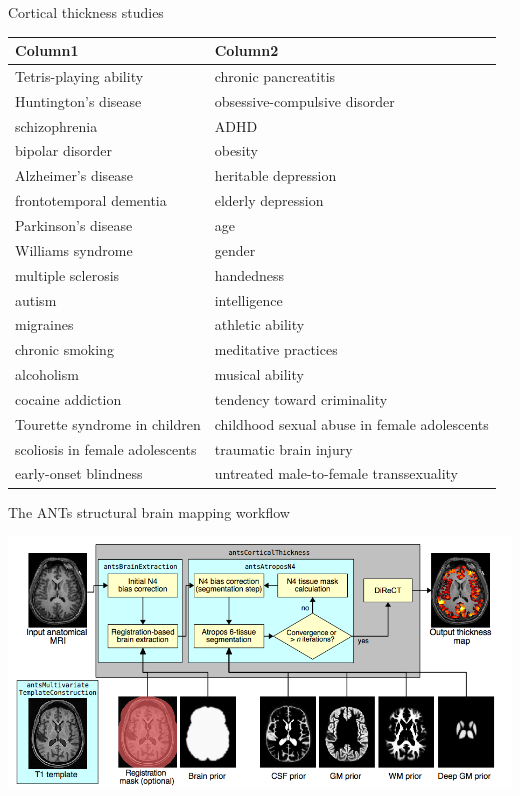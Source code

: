 \documentclass[ignorenonframetext,]{beamer}
\begin{document}
\begin{frame}{Cortical thickness studies}

\begin{longtable}[c]{@{}ll@{}}
\toprule
Column1 & Column2\tabularnewline
\midrule
\endhead
Tetris-playing ability & chronic pancreatitis\tabularnewline
Huntington's disease & obsessive-compulsive disorder\tabularnewline
schizophrenia & ADHD\tabularnewline
bipolar disorder & obesity\tabularnewline
Alzheimer's disease & heritable depression\tabularnewline
frontotemporal dementia & elderly depression\tabularnewline
Parkinson's disease & age\tabularnewline
Williams syndrome & gender\tabularnewline
multiple sclerosis & handedness\tabularnewline
autism & intelligence\tabularnewline
migraines & athletic ability\tabularnewline
chronic smoking & meditative practices\tabularnewline
alcoholism & musical ability\tabularnewline
cocaine addiction & tendency toward criminality\tabularnewline
Tourette syndrome in children & childhood sexual abuse in female
adolescents\tabularnewline
scoliosis in female adolescents & traumatic brain injury\tabularnewline
early-onset blindness & untreated male-to-female
transsexuality\tabularnewline
\bottomrule
\end{longtable}

\end{frame}

\begin{frame}{The ANTs structural brain mapping workflow}

\includegraphics{./evaluation/figures/pipeline.png}

\end{frame}
\end{document}

